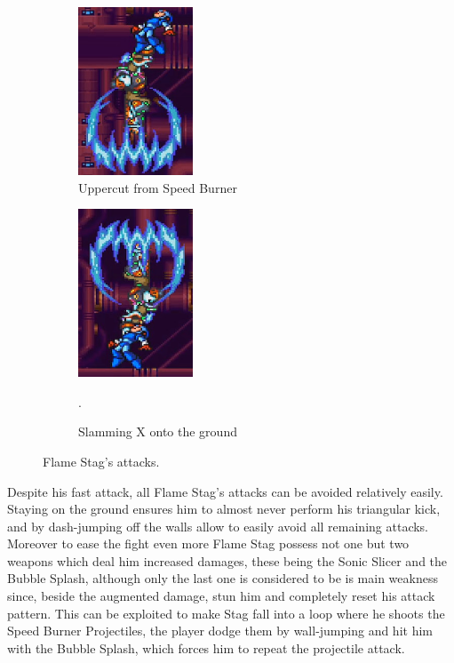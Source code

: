 \begin{figure}
	\ContinuedFloat
	\centering
	\begin{subfigure}[t]{0.4\linewidth}
		\centering
		\includegraphics[height=5cm]{figures/X2/Flame_stag/Stag_uppercut.png}
		\caption{Uppercut from Speed Burner}
	\end{subfigure}
	\begin{subfigure}[t]{0.4\linewidth}
		\centering
		\includegraphics[height=5cm]{figures/X2/Flame_stag/Stag_descend.png}
		\caption{Slamming X onto the ground}.
	\end{subfigure}
	\caption{Flame Stag's attacks.}
\end{figure}

Despite his fast attack, all Flame Stag's attacks can be avoided relatively easily. Staying on the ground ensures him to almost never perform his triangular kick, and by dash-jumping off the walls allow to easily avoid all remaining attacks. Moreover to ease the fight even more Flame Stag possess not one but two weapons which deal him increased damages, these being the Sonic Slicer and the Bubble Splash, although only the last one is considered to be is main weakness since, beside the augmented damage, stun him and completely reset his attack pattern. This can be exploited to make Stag fall into a loop where he shoots the Speed Burner Projectiles, the player dodge them by wall-jumping and hit him with the Bubble Splash, which forces him to repeat the projectile attack.

